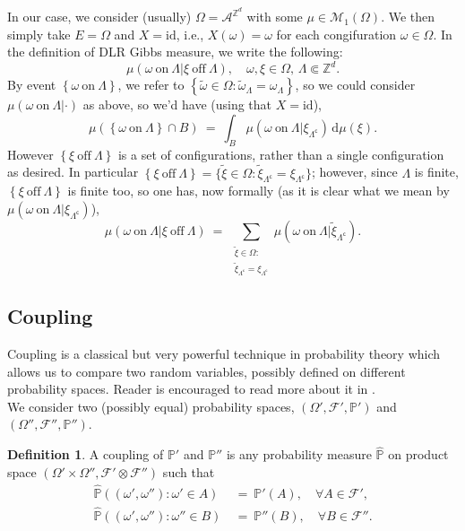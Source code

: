 \documentclass[12pt]{article}
\newcommand{\A}{\mathcal{A}}
\renewcommand{\d}{\mathrm{d}}
\newcommand{\F}{\mathcal{F}}
\newcommand{\M}{\mathcal{M}}
\renewcommand{\P}{\mathbb{P}}
\newcommand{\Z}{\mathbb{Z}}
\newcommand{\set}[1]{\left\{#1\right\}}
\newcommand{\pika}{\boldsymbol{\cdot}}
\newcommand{\1}{\mathbbm{1}}
\renewcommand{\c}{\mathsf{c}}
\newcommand{\5}{\vspace{0.5cm}}
\renewcommand{\tilde}{\widetilde}
\renewcommand{\hat}{\widehat}
\theoremstyle{definition}
\newtheorem{df}[thm]{Definition}
\begin{document}
In our case, we consider (usually) $\Omega=\A^{\Z^d}$ with some $\mu\in\M_1(\Omega)$. We then simply take $E=\Omega$ and $X=\mathrm{id}$, i.e., $X(\omega)=\omega$ for each congifuration $\omega\in\Omega$. In the definition of DLR Gibbs measure, we write the following:
$$\mu(\omega~\text{on}~\Lambda|\xi~\text{off}~\Lambda),\quad \omega,\xi\in\Omega,\,\Lambda\Subset\Z^d.$$
By event $\set{\omega~\text{on}~\Lambda}$, we refer to $\set{\tilde{\omega}\in\Omega:\tilde{\omega}_\Lambda=\omega_\Lambda}$, so we could consider $\mu(\omega~\text{on}~\Lambda|\pika)$ as above, so we'd have (using that $X=\mathrm{id}$),
$$\mu(\set{\omega~\text{on}~\Lambda}\cap B) ~=~ \int_B \mu(\omega~\text{on}~\Lambda|\xi_{\Lambda^\c})\,\d\mu(\xi).$$
However $\set{\xi~\text{off}~\Lambda}$ is a set of configurations, rather than a single configuration as desired. In particular $\set{\xi~\text{off}~\Lambda}=\{\tilde{\xi}\in\Omega:\tilde{\xi}_{\Lambda^\c}=\xi_{\Lambda^\c}\}$; however, since $\Lambda$ is finite, $\set{\xi~\text{off}~\Lambda}$ is finite too, so one has, now formally (as it is clear what we mean by $\mu(\omega~\text{on}~\Lambda|\xi_{\Lambda^\c})$),
$$\mu(\omega~\text{on}~\Lambda|\xi~\text{off}~\Lambda) ~=~ \sum_{\substack{\tilde{\xi}\in\Omega:\\\tilde{\xi}_{\Lambda^\c}=\xi_{\Lambda^\c}}}\mu(\omega~\text{on}~\Lambda|\tilde{\xi}_{\Lambda^\c}).$$ 


\subsection{Coupling}\label{app:2}

Coupling is a classical but very powerful technique in probability theory which allows us to compare two random variables, possibly defined on different probability spaces. Reader is encouraged to read more about it in \cite{dH}.\\ 

We consider two (possibly equal) probability spaces, $(\Omega',\F',\P')$ and $(\Omega'',\F'',\P'')$.

\begin{df}
A coupling of $\P'$ and $\P''$ is any probability measure $\hat{\P}$ on product space $(\Omega'\times\Omega'',\F'\otimes\F'')$ such that 
\begin{align*}
\hat{\P}((\omega',\omega''):\omega'\in A) ~&=~ \P'(A), \quad \forall A\in\F', \\
\hat{\P}((\omega',\omega''):\omega''\in B) ~&=~ \P''(B), \quad \forall B\in\F''.
\end{align*}
\end{df}
\end{document}
